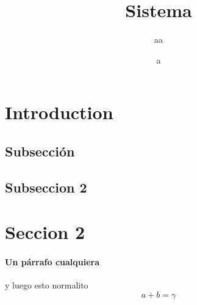 \documentclass{article}
\title{Sistema}
\author{aa}
\date{a}
\begin{document}
\maketitle

\section{Introduction}

\subsection{Subsección}

\subsection{Subseccion 2}
\section{Seccion 2}
\paragraph{Un párrafo cualquiera} y luego esto normalito 
\begin{equation}
a+b=\gamma\label{eq1}    
\end{equation}
\end{document}
